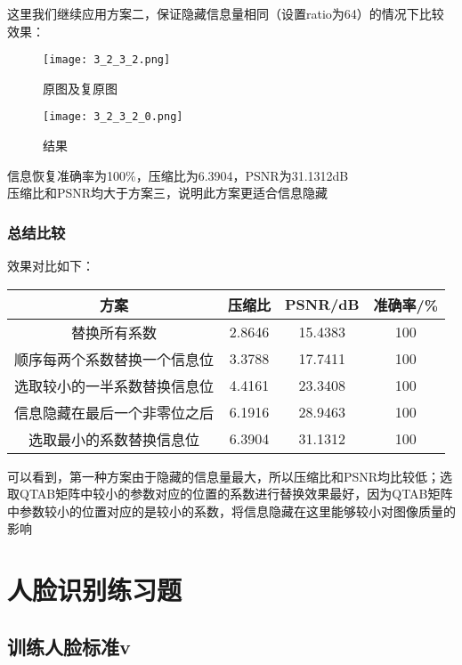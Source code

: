 \documentclass[12pt]{article}
\begin{document}
这里我们继续应用方案二，保证隐藏信息量相同（设置ratio为64）的情况下比较效果：
\begin{figure}[H]
    \centering
    \texttt{[image: 3\_2\_3\_2.png]}
    \caption{原图及复原图}
\end{figure}

\begin{figure}[H]
    \centering
    \texttt{[image: 3\_2\_3\_2\_0.png]}
    \caption{结果}
\end{figure}

信息恢复准确率为100\%，压缩比为6.3904，PSNR为31.1312dB\\

\hspace*{2em}压缩比和PSNR均大于方案三，说明此方案更适合信息隐藏

\subsubsection{总结比较}

效果对比如下：
\begin{table}[H]
    \centering
    \begin{tabular}{|c|c|c|c|}
    \hline
    方案 & 压缩比 & PSNR/dB & 准确率/\%  \\
    \hline
    替换所有系数 & 2.8646 & 15.4383 & 100 \\
    \hline
    顺序每两个系数替换一个信息位 & 3.3788 & 17.7411 & 100 \\
    \hline
    选取较小的一半系数替换信息位 & 4.4161 & 23.3408 & 100\\
    \hline
    信息隐藏在最后一个非零位之后 & 6.1916 & 28.9463 & 100\\
    \hline
    选取最小的系数替换信息位 & 6.3904 & 31.1312 & 100 \\
    \hline
    \end{tabular}
\end{table}

可以看到，第一种方案由于隐藏的信息量最大，所以压缩比和PSNR均比较低；选取QTAB矩阵中较小的参数对应的位置的系数进行替换效果最好，因为QTAB矩阵中参数较小的位置对应的是较小的系数，将信息隐藏在这里能够较小对图像质量的影响

\section{人脸识别练习题}
\subsection{训练人脸标准v }
\end{document}
